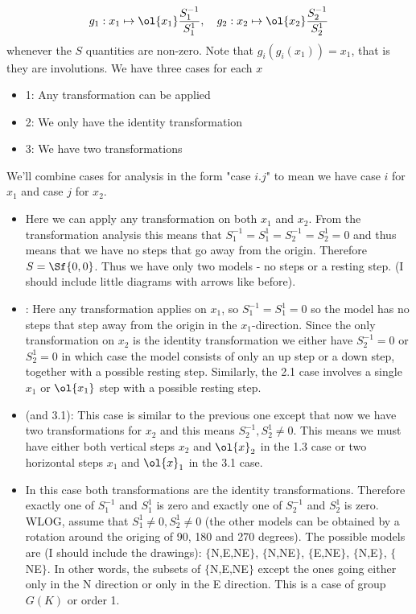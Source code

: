 \[
	g_1 : x_1 \mapsto \ol{x_1}\frac{S_1^{-1}}{S_1^{1}},\quad g_2 : x_2 \mapsto \ol{x_2}\frac{S_2^{-1}}{S_2^{1}}
\]
whenever the $S$ quantities are non-zero. Note that $g_i(g_i(x_1)) = x_1$, that is they are involutions. We have three cases for each $x$
\begin{itemize}
\item 1: Any transformation can be applied
\item 2: We only have the identity transformation
\item 3: We have two transformations
 \end{itemize}
 We'll combine cases for analysis in the form "case $i.j$" to mean we have case $i$ for $x_1$ and case $j$ for $x_2$.

\begin{itemize}
\item [Case 1.1:] Here we can apply any transformation on both $x_1$ and $x_2$. From the transformation analysis this means that $S_1^{-1} = S_1^1 = S_2^{-1} = S_2^1 = 0$ and thus means that we have no steps that go away from the origin. Therefore $S = \Sf{0,0}$. Thus we have only two models - no steps or a resting step. (I should include little diagrams with arrows like before).
\item[Case 1.2]: Here any transformation applies on $x_1$, so $S_1^{-1} = S_1^1 = 0$ so the model has no steps that step away from the origin in the $x_1$-direction. Since the only transformation on $x_2$ is the identity transformation we either have $S_2^{-1} = 0$ or $S_2^1 = 0$ in which case the model consists of only an up step or a down step, together with a possible resting step. Similarly, the 2.1 case involves a single $x_1$ or $\ol{x_1}$ step with a possible resting step.
\item[Case 1.3:] (and 3.1): This case is similar to the previous one except that now we have two transformations for $x_2$ and this means $S_2^{-1}, S_2^1 \neq 0$. This means we must have either both vertical steps $x_2$ and $\ol{x}_2$ in the 1.3 case or two horizontal steps $x_1$ and $\ol{x}_1$ in the 3.1 case.
\item[Case 2.2:] In this case both transformations are the identity transformations. Therefore exactly one of $S_1^{-1}$ and $S_1^1$ is zero and exactly one of $S_2^{-1}$ and $S_2^1$ is zero. WLOG, assume that $S_1^1 \neq 0, S_2^1 \neq 0$ (the other models can be obtained by a rotation around the origing of 90, 180 and 270 degrees). The possible models are (I should include the drawings): $\{$N,E,NE$\}$, $\{$N,NE$\}$, $\{$E,NE$\}$, $\{$N,E$\}$, $\{$NE$\}$. In other words, the subsets of $\{$N,E,NE$\}$ except the ones going either only in the N direction or only in the E direction. This is a case of group $G(K)$ or order 1.

\end{itemize}
